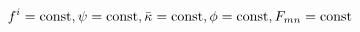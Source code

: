 \begin{equation}\label{corset}
f^i={\rm const}, \psi ={\rm const}, \bar\kappa ={\rm const}, \phi
={\rm const}, F_{mn} ={\rm const}
\end{equation}

